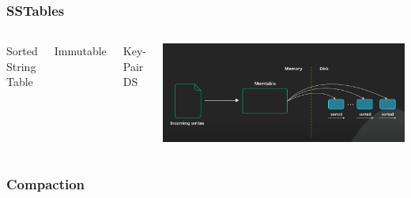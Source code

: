 \documentclass[
	11pt, 
]{beamer}
\begin{document}
\begin{frame}
    \frametitle{SSTables}
    \begin{columns}
            \begin{tcolorbox}[colback=white, colframe=blue!50!black, arc=4mm]
                Sorted String Table
            \end{tcolorbox}
            \begin{tcolorbox}[colback=white, colframe=blue!50!black, arc=4mm]
                Immutable
            \end{tcolorbox}
            \begin{tcolorbox}[colback=white, colframe=blue!50!black, arc=4mm]
                Key-Pair DS
            \end{tcolorbox}
             \includegraphics[scale=0.16]{SSTables.png}
    \end{columns} 
    
\end{frame}

\subsubsection{Compaction}
\end{document}
